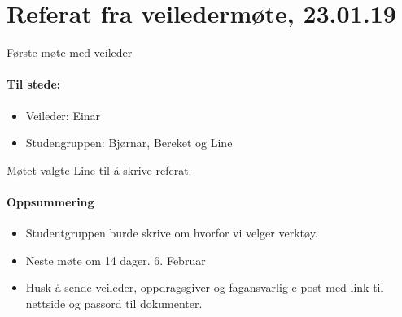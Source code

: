 \chapter{Referat fra veiledermøte, 23.01.19}

Første møte med veileder

\subsubsection{Til stede:} 
\begin{itemize}
\item Veileder: Einar
\item Studengruppen: Bjørnar, Bereket og Line
\end{itemize}


Møtet valgte Line til å skrive referat.

\subsubsection{Oppsummering}

\begin{itemize}
\item Studentgruppen burde skrive om hvorfor vi velger verktøy.
\item Neste møte om 14 dager. 6. Februar
\item Husk å sende veileder, oppdragsgiver og fagansvarlig e-post med link til nettside og passord til dokumenter. 
\end{itemize}

